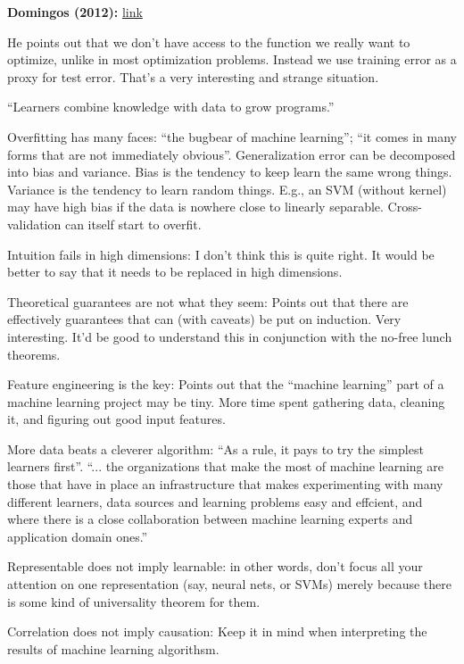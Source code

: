 \documentclass[12pt]{article}
\newcommand{\link}[2]{\href{#1}{#2}}
\begin{document}
\textbf{Domingos (2012):} \link{http://scholar.google.ca/scholar?cluster=4404716649035182981\&hl=en\&as\_sdt=0,5}{link}

He points out that we don't have access to the function we really want
to optimize, unlike in most optimization problems.  Instead we use
training error as a proxy for test error.  That's a very interesting
and strange situation.

``Learners combine knowledge with data to grow programs.''

Overfitting has many faces: ``the bugbear of machine learning''; ``it
comes in many forms that are not immediately obvious''.
Generalization error can be decomposed into bias and variance.  Bias
is the tendency to keep learn the same wrong things.  Variance is the
tendency to learn random things.  E.g., an SVM (without kernel) may
have high bias if the data is nowhere close to linearly separable.
Cross-validation can itself start to overfit.

Intuition fails in high dimensions: I don't think this is quite right.
It would be better to say that it needs to be replaced in high
dimensions.

Theoretical guarantees are not what they seem: Points out that there
are effectively guarantees that can (with caveats) be put on
induction.  Very interesting.  It'd be good to understand this in
conjunction with the no-free lunch theorems.

Feature engineering is the key: Points out that the ``machine
learning'' part of a machine learning project may be tiny.  More time
spent gathering data, cleaning it, and figuring out good input
features.

More data beats a cleverer algorithm: ``As a rule, it pays to try the
simplest learners first''.  ``... the organizations that make the most
of machine learning are those that have in place an infrastructure
that makes experimenting with many different learners, data sources
and learning problems easy and effcient, and where there is a close
collaboration between machine learning experts and application domain
ones.''

Representable does not imply learnable: in other words, don't focus
all your attention on one representation (say, neural nets, or SVMs)
merely because there is some kind of universality theorem for them.

Correlation does not imply causation: Keep it in mind when
interpreting the results of machine learning algorithsm.
\end{document}
